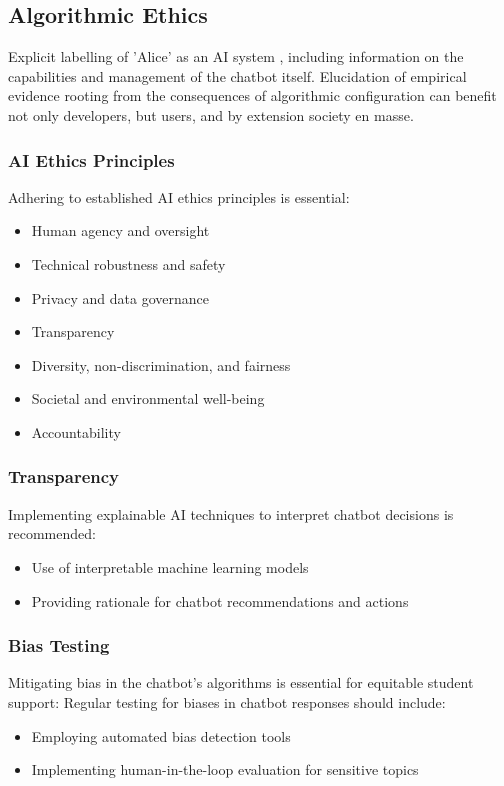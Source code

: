 \documentclass[14pt,a4paper]{article}
\begin{document}
\begin{multicols}{2}
\subsection{Algorithmic Ethics}
Explicit labelling of 'Alice' as an AI system \textit{\parencite{IEEE2023}}, including information on the capabilities and management of the chatbot itself. Elucidation of empirical evidence rooting from the consequences of algorithmic configuration can benefit not only developers, but users, and by extension society en masse.

\subsubsection{AI Ethics Principles}
Adhering to established AI ethics principles \textit{\parencite{EC2024}} is essential:
\begin{itemize}
    \item Human agency and oversight
    \item Technical robustness and safety
    \item Privacy and data governance
    \item Transparency
    \item Diversity, non-discrimination, and fairness
    \item Societal and environmental well-being
    \item Accountability
\end{itemize}

\subsubsection{Transparency}
Implementing explainable AI techniques to interpret chatbot decisions \textit{\parencite[pp. 82-115]{Arrieta2022}} is recommended:
\begin{itemize}
    \item Use of interpretable machine learning models
    \item Providing rationale for chatbot recommendations and actions
\end{itemize}

\subsubsection{Bias Testing}

Mitigating bias in the chatbot's algorithms is essential for equitable student support:
Regular testing for biases in chatbot responses \textit{\parencite{ACMFAccT2024}} should include:
\begin{itemize}
    \item Employing automated bias detection tools
    \item Implementing human-in-the-loop evaluation for sensitive topics
\end{itemize}


\end{multicols}
\end{document}
